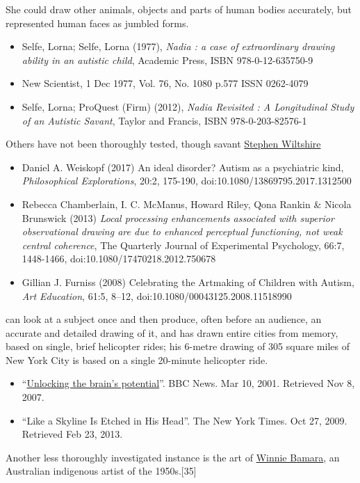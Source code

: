 \documentclass{book}
\numberwithin{equation}{section}
\begin{document}
She could draw other animals, objects and parts of human bodies accurately, but represented human faces as jumbled forms.
\begin{itemize}
    \item Selfe, Lorna; Selfe, Lorna (1977), \textit{Nadia : a case of extraordinary drawing ability in an autistic child}, Academic Press, ISBN 978-0-12-635750-9
    \item New Scientist, 1 Dec 1977, Vol. 76, No. 1080 p.577 ISSN 0262-4079
    \item Selfe, Lorna; ProQuest (Firm) (2012), \textit{Nadia Revisited : A Longitudinal Study of an Autistic Savant}, Taylor and Francis, ISBN 978-0-203-82576-1
\end{itemize}
Others have not been thoroughly tested, though savant \href{https://en.wikipedia.org/wiki/Stephen_Wiltshire}{Stephen Wiltshire}
\begin{itemize}
    \item Daniel A. Weiskopf (2017) An ideal disorder? Autism as a psychiatric kind, \textit{Philosophical Explorations}, 20:2, 175-190, doi:10.1080/13869795.2017.1312500
    \item Rebecca Chamberlain, I. C. McManus, Howard Riley, Qona Rankin \& Nicola Brunswick (2013) \textit{Local processing enhancements associated with superior observational drawing are due to enhanced perceptual functioning, not weak central coherence}, The Quarterly Journal of Experimental Psychology, 66:7, 1448-1466, doi:10.1080/17470218.2012.750678
    \item Gillian J. Furniss (2008) Celebrating the Artmaking of Children with Autism, \textit{Art Education}, 61:5, 8--12, doi:10.1080/00043125.2008.11518990
\end{itemize}
can look at a subject once and then produce, often before an audience, an accurate and detailed drawing of it, and has drawn entire cities from memory, based on single, brief helicopter rides; his 6-metre drawing of 305 square miles of New York City is based on a single 20-minute helicopter ride.
\begin{itemize}
    \item ``\href{http://news.bbc.co.uk/1/hi/health/1211299.stm}{Unlocking the brain's potential}''. BBC News. Mar 10, 2001. Retrieved Nov 8, 2007.
    \item ``Like a Skyline Is Etched in His Head''. The New York Times. Oct 27, 2009. Retrieved Feb 23, 2013.
\end{itemize}
Another less thoroughly investigated instance is the art of \href{https://en.wikipedia.org/wiki/Winnie_Bamara}{Winnie Bamara}, an Australian indigenous artist of the 1950s.[35]
\end{document}
